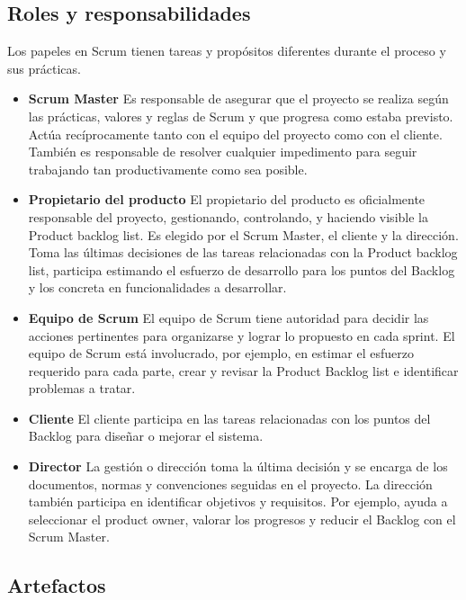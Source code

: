 \subsection{Roles y responsabilidades}
Los papeles en Scrum tienen tareas y propósitos diferentes durante el proceso y sus prácticas.

\begin{itemize}
\item \textbf{Scrum Master} Es responsable de asegurar que el proyecto se realiza según las prácticas, valores y reglas de Scrum y que progresa como estaba previsto. Actúa recíprocamente tanto con el equipo del proyecto como con el cliente. También es responsable de resolver cualquier impedimento para seguir trabajando tan productivamente como sea posible. 

\item \textbf{Propietario del producto} El propietario del producto es oficialmente responsable del proyecto, gestionando, controlando, y haciendo visible la Product backlog list. Es elegido por el Scrum Master, el cliente y la dirección. Toma las últimas decisiones de las tareas relacionadas con la Product backlog list, participa estimando el esfuerzo de desarrollo para los puntos del Backlog y los concreta en funcionalidades a desarrollar.

\item \textbf{Equipo de Scrum} El equipo de Scrum tiene autoridad para decidir las acciones pertinentes para organizarse y lograr lo propuesto en cada sprint. El equipo de Scrum está involucrado, por ejemplo, en estimar el esfuerzo requerido para cada parte, crear y revisar la Product Backlog list e identificar problemas a tratar.

\item \textbf{Cliente} El cliente participa en las tareas relacionadas con los puntos del Backlog para diseñar o mejorar el sistema.

\item \textbf{Director} La gestión o dirección toma la última decisión y se encarga de los documentos, normas y convenciones seguidas en el proyecto. La dirección también participa en identificar objetivos y requisitos. Por ejemplo, ayuda a seleccionar el product owner, valorar los progresos y reducir el Backlog con el Scrum Master.
\end{itemize}

\subsection{Artefactos}
